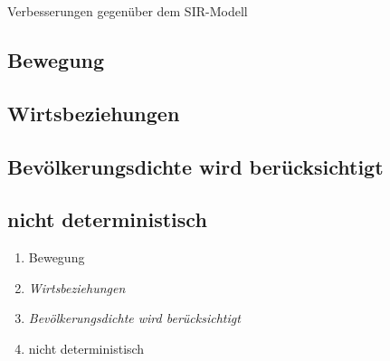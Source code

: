 Verbesserungen gegenüber dem SIR-Modell

\subsection{Bewegung}
\subsection{Wirtsbeziehungen}

\subsection{Bevölkerungsdichte wird berücksichtigt}

\subsection{nicht deterministisch}

\begin{enumerate}
\item{Bewegung}
\item{\emph{Wirtsbeziehungen}



}
\item{\emph{Bevölkerungsdichte wird berücksichtigt}


}
\item{nicht deterministisch}
\end{enumerate}